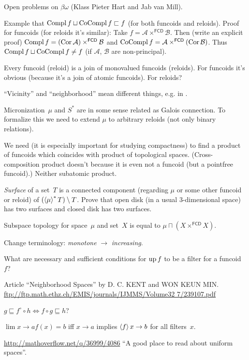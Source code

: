 \documentclass{amsart}
\begin{document}
Open problems on $\beta\omega$ (Klass Pieter Hart and Jab van Mill).

Example that $\operatorname{Compl} f\sqcup\operatorname{CoCompl} f\sqsubset f$ (for both funcoids and reloids).
Proof for funcoids (for reloids it's similar): Take $f=\mathcal{A}\times^{\mathsf{FCD}}\mathcal{B}$. Then (write an explicit proof)
$\operatorname{Compl} f=(\operatorname{Cor}\mathcal{A})\times^{\mathsf{FCD}}\mathcal{B}$ and $\operatorname{CoCompl} f=\mathcal{A}\times^{\mathsf{FCD}}(\operatorname{Cor}\mathcal{B})$.
Thus $\operatorname{Compl} f\sqcup\operatorname{CoCompl} f\ne f$ (if $\mathcal{A}$, $\mathcal{B}$ are non-principal).

Every funcoid (reloid) is a join of monovalued funcoids (reloids). For funcoids it's obvious
(because it's a join of atomic funcoids). For reloids?

``Vicinity'' and ``neighborhood'' mean different things, e.g. in \cite{converg}.

Micronization~$\mu$ and $S^\ast$ are in some sense related as Galois connection.
To formalize this we need to extend $\mu$ to arbitrary reloids (not only binary relations).

We need (it is especially important for studying compactness) to find a product of funcoids which coincides with
product of topological spaces. (Cross-composition product doesn't because it is even not a funcoid (but a pointfree funcoid).)
Neither subatomic product.

\emph{Surface} of a set~$T$ is a connected component (regarding $\mu$ or
some other funcoid or reloid) of $(\left\langle \mu\right\rangle ^{\ast}T)\setminus T$.
Prove that open disk (in a usual 3-dimensional space) has two surfaces
and closed disk has two surfaces.

Subspace topology for space~$\mu$ and set~$X$ is equal to $\mu\sqcap(X\times^{\mathsf{FCD}} X)$.

Change terminology: \emph{monotone} $\rightarrow$ \emph{increasing}.

What are necessary and sufficient conditions for $\operatorname{up} f$ to be a filter for a funcoid~$f$?

Article ``Neighborhood Spaces'' by D. C. KENT and WON KEUN MIN.
\url{ftp://ftp.math.ethz.ch/EMIS/journals/IJMMS/Volume32 7/239107.pdf}

$g\sqsubseteq f^{\circ}\circ h \Leftrightarrow f\circ g\sqsubseteq h$?

$\lim {x\rightarrow a} f(x) = b$ iff $x\rightarrow a$ implies $\left\langle f\right\rangle x\rightarrow b$ for all filters~$x$.

\url{http://mathoverflow.net/q/36999/4086} ``A good place to read about uniform spaces''.
\end{document}
